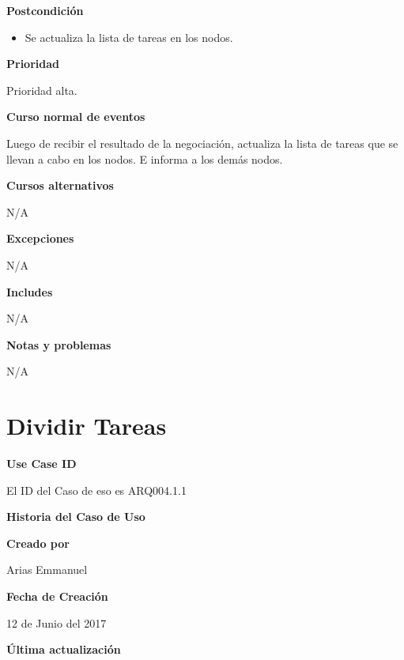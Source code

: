 \large\textbf{Postcondición}
\begin{itemize}
  \item Se actualiza la lista de tareas en los nodos.
\end{itemize}
\large\textbf{Prioridad}
\vspace{3mm}

Prioridad alta.

\large\textbf{Curso normal de eventos}
\vspace{3mm}

Luego de recibir el resultado de la negociación, actualiza la lista
de tareas que se llevan a cabo en los nodos. E informa a los demás nodos.

\large\textbf{Cursos alternativos}
\vspace{3mm}

N/A

\large\textbf{Excepciones}
\vspace{3mm}

N/A

\large\textbf{Includes}
\vspace{3mm}

N/A

\large\textbf{Notas y problemas}
\vspace{3mm}

N/A



\section{Dividir Tareas}\label{uc:DividirTareas}

\large\textbf{Use Case ID}
\vspace{3mm}

El ID del Caso de eso es ARQ004.1.1

\Large\textbf{Historia del Caso de Uso}
\vspace{3mm}

\large\textbf{Creado por}
\vspace{3mm}

Arias Emmanuel

\large\textbf{Fecha de Creación}
\vspace{3mm}

12 de Junio del 2017

\large\textbf{Última actualización}
\vspace{3mm}

